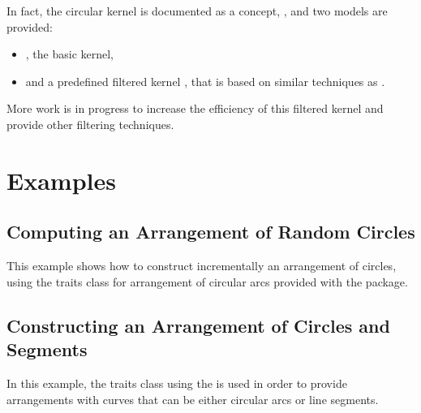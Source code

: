 In fact, the circular kernel is documented as a concept, , 
and two models are provided: 
\begin{itemize}
\item {} , the basic kernel, 
\item {} and
a predefined filtered kernel , 
that is based on similar techniques as 
. 
\end{itemize}
More work is in progress to increase the efficiency of this filtered kernel
and provide other filtering techniques. 

\section{Examples}

	\subsection{Computing an Arrangement of Random Circles} 

This example shows how to construct incrementally an arrangement of
circles, using the traits class for arrangement of circular arcs
provided with the package.


	\subsection{Constructing an Arrangement of Circles and Segments} 

In this example, the traits class using the
is used in order to provide arrangements with curves that can be
either circular arcs or line segments.

